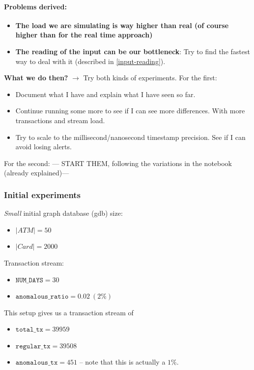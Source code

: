 \paragraph{Problems derived:\\}
\begin{itemize}
    \item \textbf{The load we are simulating is way higher than real (of course higher than for the real time approach)}
    \item \textbf{The reading of the input can be our bottleneck}: Try to find the fastest way to deal with it (described in \ref{input-reading}).    
\end{itemize}

\textbf{What we do then?}
$\rightarrow$ Try both kinds of experiments. 
For the first:
\begin{itemize}
    \item Document what I have and explain what I have seen so far.
    \item Continue running some more to see if I can see more differences. With more transactions and stream load.
    \item Try to scale to the millisecond/nanosecond timestamp precision. See if I can avoid losing alerts.
\end{itemize}
For the second:
--- START THEM, following the variations in the notebook (already explained)---


\subsubsection{Initial experiments}

\textit{Small} initial graph database (gdb) size:
\begin{itemize}
  \item $|ATM| = 50$
  \item $|Card| = 2000$
\end{itemize}

Transaction stream:
\begin{itemize}
  \item $\texttt{NUM\_DAYS} = 30$
  \item $\texttt{anomalous\_ratio} = 0.02\ (2\%)$ 
\end{itemize}

This setup gives us a transaction stream of 
\begin{itemize}
  \item $\texttt{total\_tx} = 39959$
  \item $\texttt{regular\_tx} = 39508$
  \item $\texttt{anomalous\_tx} = 451$ -- note that this is actually a $1\%$.
\end{itemize}

